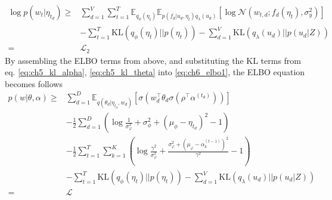 

\begin{align}\label{eq:ch5_elbo_p2}
\log p(w_t|\eta_{t_d})\geq&\sum_{d=1}^{V}\sum_{t=1}^{T}\mathbb{E}_{q_\phi(\eta_t)}\mathbb{E}_{p(f_d|u_d,\eta_t)q_{\lambda}(u_d)}\left[\log\mathcal{N}(w_{t,d};f_d(\eta_t),\sigma_y^2)\right]\\
&-\sum_{t=1}^{T}\text{KL}(q_{\phi}(\eta_t)||p(\eta_t))-\sum_{d=1}^{V}\text{KL}(q_\lambda(u_d)||p(u_d|Z))\\
=&\mathcal{L}_2
\end{align}
By assembling the ELBO terms from above, and substituting the KL terms from eq. \ref{eq:ch5_kl_alpha}, \ref{eq:ch5_kl_theta} into \ref{eq:ch6_elbo1}, the ELBO equation becomes follows
\begin{align}\label{eq:ch6_elbo2}
p(w|\theta,\alpha)\geq&\sum_{d=1}^{D}\mathbb{E}_{ q(\theta_d|\eta_{t_d},w_d)}[\sigma(w_{d}^\top\theta_d\sigma(\rho^\top\alpha^{(t_d)}))]\\
&-\frac{1}{2}\sum_{d=1}^{D}\left(\log\frac{1}{\sigma_\varphi^2}+\sigma_\phi^2+(\mu_\phi-\eta_{t_d})^2-1\right)\\
&-\frac{1}{2}\sum_{t=1}^{T}\sum_{k=1}^{K}\left(\log\frac{\gamma^2}{\sigma_\varphi^2}+\frac{\sigma_\varphi^2+(\mu_\varphi-\alpha_k^{(t-1)})^2}{\gamma^2}-1\right)\\
&-\sum_{t=1}^{T}\text{KL}(q_{\phi}(\eta_t)||p(\eta_t))-\sum_{d=1}^{V}\text{KL}(q_\lambda(u_d)||p(u_d|Z))\\
=&\mathcal{L}
\end{align}
